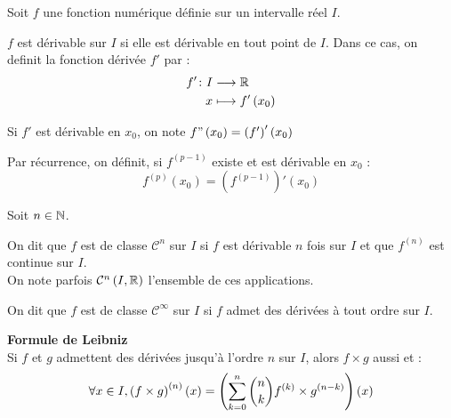 \documentclass[12pt,twoside,a4paper]{article}
\author{MPSI 2}
\begin{document}
	\maketitle
	\begin{flushleft}
		Soit $f$ une fonction num\'erique d\'efinie sur un intervalle r\'eel $I$.
	\end{flushleft}
	\begin{defi}
		$f$ est d\'erivable sur $I$ si elle est d\'erivable en tout point de $I$. Dans ce cas, on definit la fonction d\'eriv\'ee $f'$ par :
		$$
			\begin{aligned}[t]f'\colon I&\longrightarrow\mathbb{R} \\x&\longmapsto f'\left(x_0\right)\end{aligned}
		$$
		\begin{liste}
			\item Si $f'$ est d\'erivable en $x_0$, on note $f"\left(x_0\right)=\left(f'\right)'\left(x_0\right)$
			\item Par r\'ecurrence, on d\'efinit, si $f^{\left(p-1\right)}$ existe et est d\'erivable en $x_0$ :
				$$
					f^{\left(p\right)}\left(x_0\right)=\left(f^{\left(p-1\right)}\right)'\left(x_0\right)
				$$
		\end{liste}
	\end{defi}
	\begin{defi}
		Soit $n\in\mathbb{N}$.
		\begin{liste}
			\item On dit que $f$ est de classe $\mathcal{C}^n$ sur $I$ si $f$ est d\'erivable $n$ fois sur $I$ et que $f^{\left(n\right)}$ est continue sur $I$. \\
				On note parfois $\mathcal{C}^n\left(I,\mathbb{R}\right)$ l'ensemble de ces applications.
			\item On dit que $f$ est de classe $\mathcal{C}^\infty$ sur $I$ si $f$ admet des d\'eriv\'ees \`a tout ordre sur $I$.
		\end{liste}
	\end{defi}
	\begin{prop}
		\textbf{Formule de Leibniz} \\
		Si $f$ et $g$ admettent des d\'eriv\'ees jusqu'\`a l'ordre $n$ sur $I$, alors $f\times g$ aussi et :
		$$
			\forall x\in I,\left(f\times g\right)^{\left(n\right)}\left(x\right)=\left(\sum\limits_{k=0}^n\dbinom{n}{k}f^{\left(k\right)}\times g^{\left(n-k\right)}\right)\left(x\right)
		$$
	\end{prop}
\end{document}
